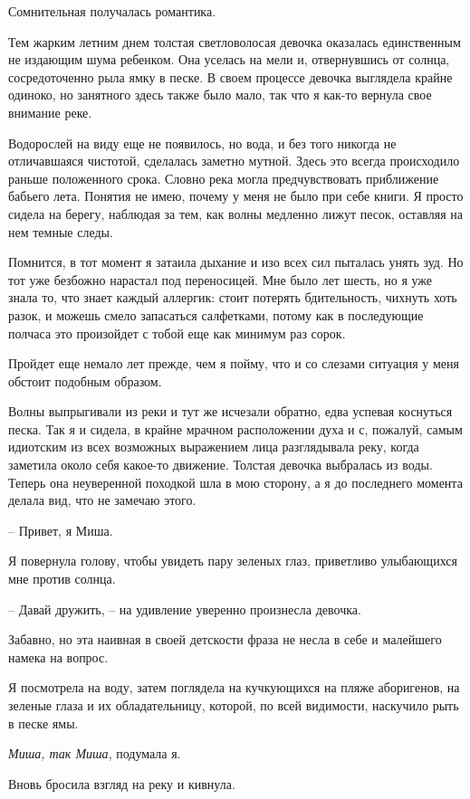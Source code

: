 \documentclass[
]{book}
\begin{document}
Сомнительная получалась романтика.

Тем жарким летним днем толстая светловолосая девочка оказалась единственным не издающим шума ребенком. Она уселась на мели и, отвернувшись от солнца, сосредоточенно рыла ямку в песке. В своем процессе девочка выглядела крайне одиноко, но занятного здесь также было мало, так что я как-то вернула свое внимание реке.

Водорослей на виду еще не появилось, но вода, и без того никогда не отличавшаяся чистотой, сделалась заметно мутной. Здесь это всегда происходило раньше положенного срока. Словно река могла предчувствовать приближение бабьего лета. Понятия не имею, почему у меня не было при себе книги. Я просто сидела на берегу, наблюдая за тем, как волны медленно лижут песок, оставляя на нем темные следы.

Помнится, в тот момент я затаила дыхание и изо всех сил пыталась унять зуд. Но тот уже безбожно нарастал под переносицей. Мне было лет шесть, но я уже знала то, что знает каждый аллергик: стоит потерять бдительность, чихнуть хоть разок, и можешь смело запасаться салфетками, потому как в последующие полчаса это произойдет с тобой еще как минимум раз сорок.

Пройдет еще немало лет прежде, чем я пойму, что и со слезами ситуация у меня обстоит подобным образом.

Волны выпрыгивали из реки и тут же исчезали обратно, едва успевая коснуться песка. Так я и сидела, в крайне мрачном расположении духа и с, пожалуй, самым идиотским из всех возможных выражением лица разглядывала реку, когда заметила около себя какое-то движение. Толстая девочка выбралась из воды. Теперь она неуверенной походкой шла в мою сторону, а я до последнего момента делала вид, что не замечаю этого.

-- Привет, я Миша.

Я повернула голову, чтобы увидеть пару зеленых глаз, приветливо улыбающихся мне против солнца.

-- Давай дружить, -- на удивление уверенно произнесла девочка.

Забавно, но эта наивная в своей детскости фраза не несла в себе и малейшего намека на вопрос.

Я посмотрела на воду, затем поглядела на кучкующихся на пляже аборигенов, на зеленые глаза и их обладательницу, которой, по всей видимости, наскучило рыть в песке ямы.

\emph{Миша, так Миша}, подумала я.

Вновь бросила взгляд на реку и кивнула.
\end{document}
